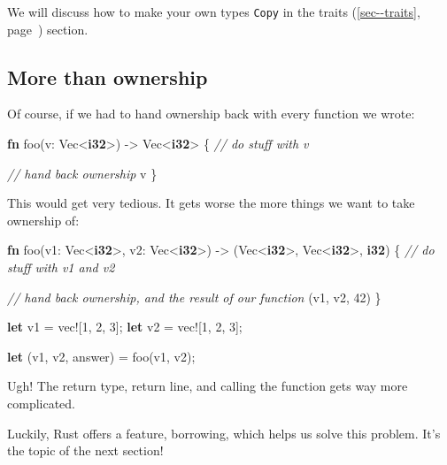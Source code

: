 \documentclass[a4paper,]{book}
\renewcommand*{\hyperref}[2][\ar]{%
  \def\ar{#2}%
  #2 (\autoref{#1}, page~\pageref{#1})}
\newenvironment{Shaded}{\begin{snugshade}}{\end{snugshade}}
\newcommand{\KeywordTok}[1]{\textcolor[rgb]{0.13,0.29,0.53}{\textbf{{#1}}}}
\newcommand{\DecValTok}[1]{\textcolor[rgb]{0.00,0.00,0.81}{{#1}}}
\newcommand{\CommentTok}[1]{\textcolor[rgb]{0.56,0.35,0.01}{\textit{{#1}}}}
\newcommand{\OtherTok}[1]{\textcolor[rgb]{0.56,0.35,0.01}{{#1}}}
\newcommand{\NormalTok}[1]{{#1}}
\begin{document}
We will discuss how to make your own types \texttt{Copy} in the
\hyperref[sec--traits]{traits} section.

\subsection{More than ownership}\label{more-than-ownership}

Of course, if we had to hand ownership back with every function we
wrote:

\begin{Shaded}
\begin{Highlighting}[]
\KeywordTok{fn} \NormalTok{foo(v: Vec<}\KeywordTok{i32}\NormalTok{>) -> Vec<}\KeywordTok{i32}\NormalTok{> \{}
    \CommentTok{// do stuff with v}

    \CommentTok{// hand back ownership}
    \NormalTok{v}
\NormalTok{\}}
\end{Highlighting}
\end{Shaded}

This would get very tedious. It gets worse the more things we want to
take ownership of:

\begin{Shaded}
\begin{Highlighting}[]
\KeywordTok{fn} \NormalTok{foo(v1: Vec<}\KeywordTok{i32}\NormalTok{>, v2: Vec<}\KeywordTok{i32}\NormalTok{>) -> (Vec<}\KeywordTok{i32}\NormalTok{>, Vec<}\KeywordTok{i32}\NormalTok{>, }\KeywordTok{i32}\NormalTok{) \{}
    \CommentTok{// do stuff with v1 and v2}

    \CommentTok{// hand back ownership, and the result of our function}
    \NormalTok{(v1, v2, }\DecValTok{42}\NormalTok{)}
\NormalTok{\}}

\KeywordTok{let} \NormalTok{v1 = }\OtherTok{vec!}\NormalTok{[}\DecValTok{1}\NormalTok{, }\DecValTok{2}\NormalTok{, }\DecValTok{3}\NormalTok{];}
\KeywordTok{let} \NormalTok{v2 = }\OtherTok{vec!}\NormalTok{[}\DecValTok{1}\NormalTok{, }\DecValTok{2}\NormalTok{, }\DecValTok{3}\NormalTok{];}

\KeywordTok{let} \NormalTok{(v1, v2, answer) = foo(v1, v2);}
\end{Highlighting}
\end{Shaded}

Ugh! The return type, return line, and calling the function gets way
more complicated.

Luckily, Rust offers a feature, borrowing, which helps us solve this
problem. It's the topic of the next section!
\end{document}
